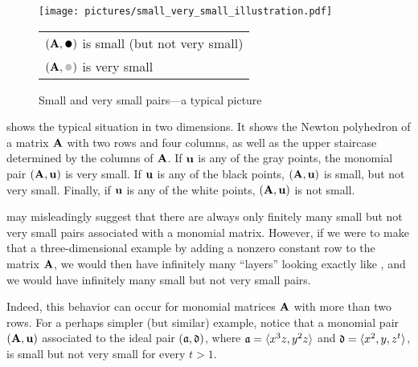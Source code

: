 \documentclass{amsart}
\begin{document}
\begin{example}
   \label{ex: small vs very small}
   \begin{figure}
      \centering
      \texttt{[image: pictures/small\_very\_small\_illustration.pdf]}\\[2mm]
      \begin{tabular}{l}
        $(\matA,\mathbin{\vcenter{\hbox{\scalebox{1.5}{$\bullet$}}}})$ is small (but not very small)\\[1mm]
        $(\matA,\textcolor{lightgray}{\mathbin{\vcenter{\hbox{\scalebox{1.5}{$\bullet$}}}}})$ is very small
      \end{tabular}                                                              
      \caption{Small and very small pairs---a typical picture}
      \label{fig: small vs very small}
   \end{figure}
    shows the typical situation in two dimensions.
   It shows the Newton polyhedron of a matrix $\mathbf{A}$ with two rows and four columns, as well as the upper staircase determined by the columns of $\mathbf{A}$.
   If $\mathbf{u}$ is any of the gray points, the monomial pair $(\mathbf{A},\mathbf{u})$ is very small.
   If $\mathbf{u}$ is any of the black points, $(\mathbf{A},\mathbf{u})$ is small, but not very small.
   Finally, if $\mathbf{u}$ is any of the white points, $(\mathbf{A},\mathbf{u})$ is not small.
\end{example}

\begin{remark}
   \label{rem: there may be infinitely many small but not very small pairs}
    may misleadingly suggest that there are always only finitely many small but not very small pairs associated with a monomial matrix.
   However, if we were to make that a three-dimensional example by adding a nonzero constant row to the matrix $\mathbf{A}$, we would then have infinitely many ``layers'' looking exactly like , and we would have infinitely many small but not very small pairs.

   Indeed, this behavior can occur for monomial matrices $\mathbf{A}$ with more than two rows.
   For a perhaps simpler (but similar) example, notice that a monomial pair $(\mathbf{A}, \mathbf{u})$ associated to the ideal pair $(\mathfrak{a}, \mathfrak{d})$, where $\mathfrak{a}= \langle x^3 z, y^2z \rangle$ and $\mathfrak{d} = \langle x^2, y, z^t \rangle$, is small but not very small for every $t > 1$.
\end{remark}
\end{document}
